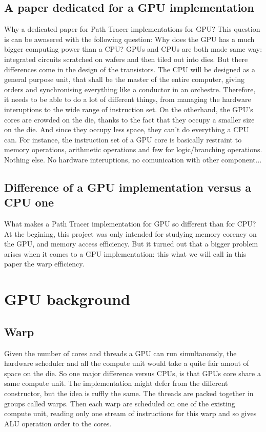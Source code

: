 \documentclass[10pt,twocolumn,a4paper]{article}
\begin{document}
\subsection{A paper dedicated for a GPU implementation}
Why a dedicated paper for Path Tracer implementations for GPU? This question is
can be awnsered with the following question: Why does the GPU has a much bigger
computing power than a CPU? GPUs and CPUs are both made same way:
integrated circuits scratched on wafers and then tiled out
into dies. But there differences come in the design of the transistors. The CPU
will be designed as a general purpose unit, that shall be the master of the
entire computer, giving orders and synchronising everything like a conductor
in an orchestre. Therefore, it needs to be able to do a lot of
different things, from managing the hardware interuptions to the wide range of
instruction set. On the otherhand, the GPU's cores are crowded on the die, thanks
to the fact that
they occupy a smaller size on the die. And since they occupy less space, they
can't do everything a CPU can. For instance, the instruction set of a GPU core
is basically restraint to memory
operations, arithmetic operations and few for logic/branching operations. Nothing else.
No hardware interuptions, no comunication with other component...

\subsection{Difference of a GPU implementation versus a CPU one}
What makes a Path Tracer implementation for GPU so different than for CPU? At
the begining, this project was only intended for studying memory corency on the
GPU, and memory access efficiency.
But it turned out that a bigger problem arises when it comes to a GPU
implementation: this what we will call in this paper the warp efficiency.

\section{GPU background}
\subsection{Warp}
Given the number of cores and threads a GPU can run simultanously, the hardware
scheduler and all the compute unit would take a quite fair amout of space on the
die. So one major difference versus CPUs, is that GPUs core share a same
compute unit. The implementation might defer from the different constructor, but
the idea is ruffly the same. The threads are packed together in groups called
warps. Then each warp are scheduled on one of the existing compute unit, reading
only one stream of instructions for this warp and so gives ALU operation order
to the cores.
\end{document}
